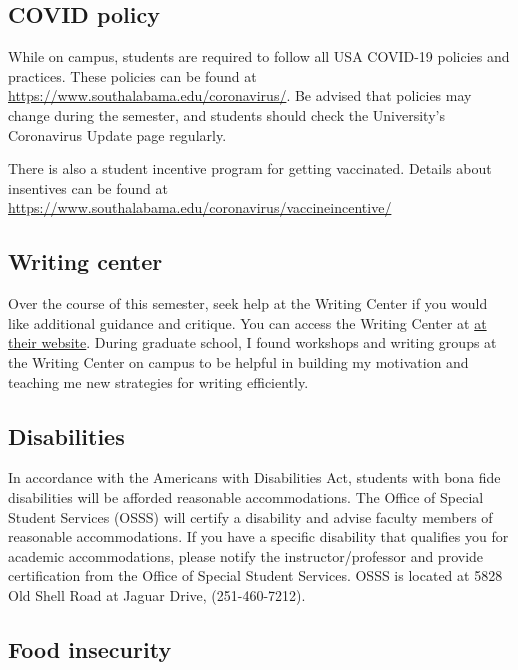 \documentclass[11pt,]{article}
\begin{document}
\hypertarget{covid-policy}{%
\subsection{COVID policy}\label{covid-policy}}

While on campus, students are required to follow all USA COVID-19
policies and practices. These policies can be found at
\url{https://www.southalabama.edu/coronavirus/}. Be advised that
policies may change during the semester, and students should check the
University's Coronavirus Update page regularly.

There is also a student incentive program for getting vaccinated.
Details about insentives can be found at
\url{https://www.southalabama.edu/coronavirus/vaccineincentive/}

\hypertarget{writing-center}{%
\subsection{Writing center}\label{writing-center}}

Over the course of this semester, seek help at the Writing Center if you
would like additional guidance and critique. You can access the Writing
Center at
\href{https://www.southalabama.edu/departments/academicsuccess/cae/how.it.works.html}{at
their website}. During graduate school, I found workshops and writing
groups at the Writing Center on campus to be helpful in building my
motivation and teaching me new strategies for writing efficiently.

\hypertarget{disabilities}{%
\subsection{Disabilities}\label{disabilities}}

In accordance with the Americans with Disabilities Act, students with
bona fide disabilities will be afforded reasonable accommodations. The
Office of Special Student Services (OSSS) will certify a disability and
advise faculty members of reasonable accommodations. If you have a
specific disability that qualifies you for academic accommodations,
please notify the instructor/professor and provide certification from
the Office of Special Student Services. OSSS is located at 5828 Old
Shell Road at Jaguar Drive, (251-460-7212).

\hypertarget{food-insecurity}{%
\subsection{Food insecurity}\label{food-insecurity}}
\end{document}

